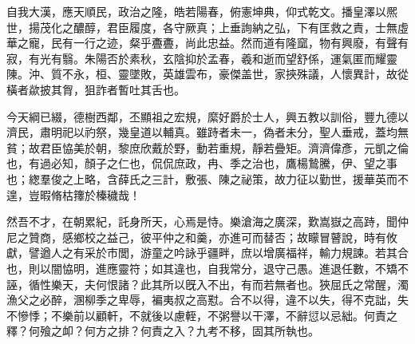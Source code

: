 \begin{pinyinscope}
 
 
 
 自我大漢，應天順民，政治之隆，皓若陽春，俯憲坤典，仰式乾文。播皇澤以熈世，揚茂化之醲醇，君臣履度，各守厥真；上垂詢納之弘，下有匡救之責，士無虛華之寵，民有一行之迹，粲乎斖斖，尚此忠益。然而道有隆窳，物有興廢，有聲有寂，有光有翳。朱陽否於素秋，玄陰抑於孟春，羲和逝而望舒係，運氣匿而耀靈陳。沖、質不永，桓、靈墜敗，英雄雲布，豪傑盖世，家挾殊議，人懷異計，故從橫者歘披其胷，狙詐者暫吐其舌也。
 
 
 
 
 今天綱已綴，德樹西鄰，丕顯祖之宏規，縻好爵於士人，興五教以訓俗，豐九德以濟民，肅明祀以礿祭，幾皇道以輔真。雖跱者未一，偽者未分，聖人垂戒，蓋均無貧；故君臣恊美於朝，黎庶欣戴於野，動若重規，靜若疊矩。濟濟偉彥，元凱之倫也，有過必知，顏子之仁也，侃侃庶政，冉、季之治也，鷹楊鷙騰，伊、望之事也；緫羣俊之上略，含薛氏之三計，敷張、陳之祕策，故力征以勤世，援華英而不遑，豈暇脩枯籜於榛穢哉！
 
 
 
 
 然吾不才，在朝累紀，託身所天，心焉是恃。樂滄海之廣深，歎嵩嶽之高跱，聞仲尼之贊商，感鄉校之益己，彼平仲之和羹，亦進可而替否；故矇冒瞽說，時有攸獻，譬遒人之有采於市閭，游童之吟詠乎疆畔，庶以增廣福祥，輸力規諫。若其合也，則以闇恊明，進應靈符；如其違也，自我常分，退守己愚。進退任數，不矯不誣，循性樂天，夫何恨諸？此其所以旣入不出，有而若無者也。狹屈氏之常醒，濁漁父之必醉，溷柳季之卑辱，褊夷叔之高懟。合不以得，違不以失，得不克詘，失不慘悸；不樂前以顧軒，不就後以慮輊，不粥譽以干澤，不辭愆以忌絀。何責之釋？何飱之卹？何方之排？何責之入？九考不移，固其所執也。
 

\end{pinyinscope}
